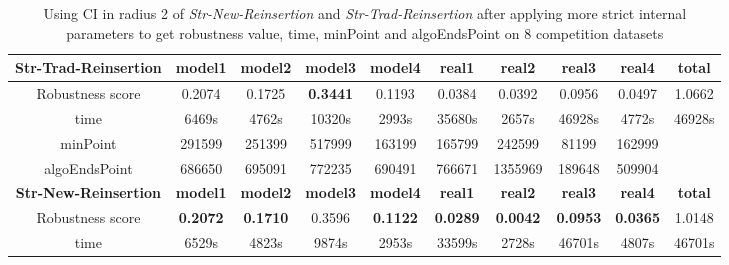 \documentclass{article}
\begin{document}
	 
	\begin{table}[!htbp]
	\begin{adjustwidth}{-2cm}{}		
		\begin{threeparttable}		
			\centering
			\caption{Using CI in radius 2 of \textit{Str-New-Reinsertion} and \textit{Str-Trad-Reinsertion}  after applying more strict internal parameters to get robustness value, time, minPoint and algoEndsPoint on 8 competition datasets}
			\label{tab:table13}
			\begin{tabular}{|c|c|c|c|c|c|c|c|c|c|}
				\hline
					
				\textbf{Str-Trad-Reinsertion} & \textbf{model1} & \textbf{model2} & \textbf{model3} & \textbf{model4} & \textbf{real1} & \textbf{real2} & \textbf{real3} & \textbf{real4} & \textbf{total} \\ \hline
				Robustness score                 & 0.2074          & 0.1725          & \textbf{0.3441}          & 0.1193          & 0.0384         & 0.0392         & 0.0956         & 0.0497         & 1.0662         \\ \hline
				time                             & 6469s           & 4762s           & 10320s          & 2993s           & 35680s         & 2657s          & 46928s         & 4772s          & 46928s         \\ \hline
				minPoint                         & 291599          & 251399          & 517999          & 163199          & 165799         & 242599         & 81199          & 162999         &                \\ \hline
				algoEndsPoint                    & 686650          & 695091          & 772235          & 690491          & 766671         & 1355969        & 189648         & 509904         &                \\ \hline
				\textbf{Str-New-Reinsertion}         & \textbf{model1} & \textbf{model2} & \textbf{model3} & \textbf{model4} & \textbf{real1} & \textbf{real2} & \textbf{real3} & \textbf{real4} & \textbf{total} \\ \hline
				Robustness score                 & \textbf{0.2072}          & \textbf{0.1710}          & 0.3596          & \textbf{0.1122}          & \textbf{0.0289}         & \textbf{0.0042}         & \textbf{0.0953}         & \textbf{0.0365}         & 1.0148         \\ \hline
				time                             & 6529s           & 4823s           & 9874s           & 2953s           & 33599s         & 2728s          & 46701s         & 4807s          & 46701s         \\ \hline

\end{tabular}
\end{threeparttable}
\end{adjustwidth}
\end{table}
\end{document}
